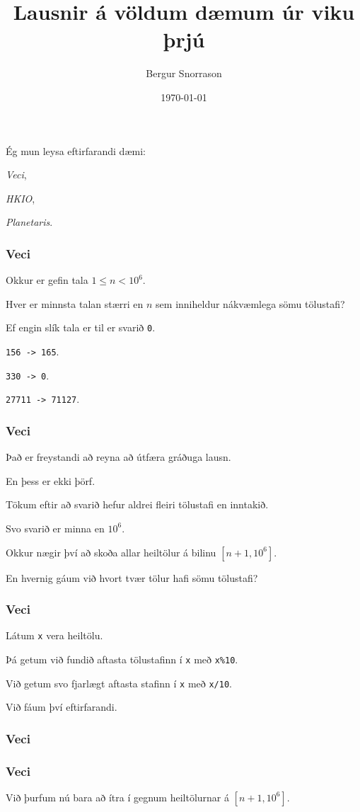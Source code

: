 \title{Lausnir á völdum dæmum úr viku þrjú}
\author{Bergur Snorrason}
\date{\today}



\frame{\titlepage}

{
	{
		\item<1-> Ég mun leysa eftirfarandi dæmi:
		{
			\item<2-> \emph{Veci},
			\item<3-> \emph{HKIO},
			\item<4-> \emph{Planetaris}.
		}
	}
}

{
	\frametitle{Veci}
	{
		\item<1-> Okkur er gefin tala $1 \leq n < 10^6$.
		\item<2-> Hver er minnsta talan stærri en $n$ sem inniheldur nákvæmlega sömu tölustafi?
		\item<3-> Ef engin slík tala er til er svarið \texttt{0}.
		\item<4-> \texttt{156 -> 165}.
		\item<5-> \texttt{330 -> 0}.
		\item<6-> \texttt{27711 -> 71127}.
	}
}

{
	\frametitle{Veci}
	{
		\item<1-> Það er freystandi að reyna að útfæra gráðuga lausn.
		\item<2-> En þess er ekki þörf.
		\item<3-> Tökum eftir að svarið hefur aldrei fleiri tölustafi en inntakið.
		\item<4-> Svo svarið er minna en $10^6$.
		\item<5-> Okkur nægir því að skoða allar heiltölur á bilinu $[n + 1, 10^6]$.
		\item<6-> En hvernig gáum við hvort tvær tölur hafi sömu tölustafi?
	}
}

{
	\frametitle{Veci}
	{
		\item<1-> Látum \texttt{x} vera heiltölu.
		\item<2-> Þá getum við fundið aftasta tölustafinn í \texttt{x} með \texttt{x\%10}.
		\item<3-> Við getum svo fjarlægt aftasta stafinn í \texttt{x} með \texttt{x/10}.
		\item<4-> Við fáum því eftirfarandi.
	}
}

{
	\frametitle{Veci}
}

{
	\frametitle{Veci}
	{
		\item<1-> Við þurfum nú bara að ítra í gegnum heiltölurnar á $[n + 1, 10^6]$.
	}
}

